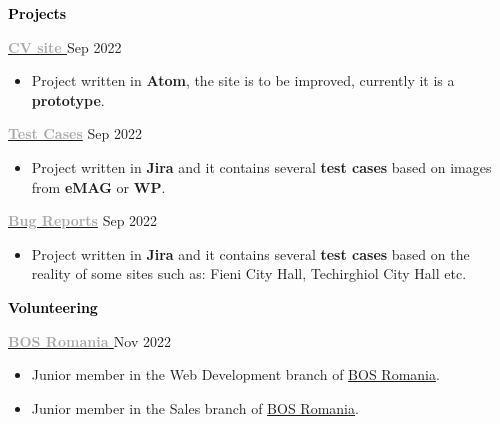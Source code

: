 \documentclass[11pt, a4paper]{article}
\newcommand{\newsection}[2]{\Large\textbf{\textcolor{#2}{#1}} \hrulefill\normalsize} %
\newcommand{\newsubsection}[4]{\normalsize\textbf{\textcolor{#3}{#1}} \hfill\small\textcolor{#4}{#2}\normalsize} %
\newcommand{\customitem}{\vspace{-1.5mm}\item}
\newenvironment{cvsection}[2] %
{
    \newsection{#1}{#2}
    \vspace{1mm}
    \small
    
}
{
    \vspace{1mm}
}
\newenvironment{newentry}[5] %
{
    \newsubsection{#1}{#2}{#3}{#4}
    \small
    
    \textcolor{#4}{#5}
    \begin{itemize}
        \small
}
{
    \end{itemize}
}
\begin{document}
\begin{cvsection}{Projects}{black}
    \begin{newentry}{\href{https://github.com/Andrei4226/CV}{\textcolor{darkgray}{CV site \faExternalLink}}}{Sep 2022}{darkgray}{mediumgray}{\vspace{-3mm}}
        \customitem Project written in \textbf{Atom}, the site is to be improved, currently it is a \textbf{prototype}.
    \end{newentry}
    
    \begin{newentry}{\href{https://github.com/Andrei4226/Test-Cases}{\textcolor{darkgray}{Test Cases\faExternalLink}}}{Sep 2022}{darkgray}{mediumgray}{\vspace{-3mm}}
        \customitem Project written in \textbf{Jira} and it contains several \textbf{test cases} based on images from \textbf{eMAG} or \textbf{WP}.
    \end{newentry}
    
    \begin{newentry}{\href{https://github.com/Andrei4226/Bug-report}{\textcolor{darkgray}{Bug Reports\faExternalLink}}}{Sep 2022 }{darkgray}{mediumgray}{\vspace{-3mm}}
        \customitem Project written in \textbf{Jira} and it contains several \textbf{test cases} based on the reality of some sites such as: Fieni City Hall, Techirghiol City Hall etc.
    \end{newentry}

{\vspace{1mm}}

\begin{cvsection}{Volunteering}{black}
{\vspace{1mm}}
    
    \begin{newentry}{\href{https://bosromania.ro/}{\textcolor{darkgray}{BOS Romania \faExternalLink}}}{Nov 2022}{darkgray}{mediumgray}{\vspace{-3mm}}
        \customitem Junior member in the Web Development branch of \href{https://bosromania.ro/}{BOS Romania}.
        \customitem Junior member in the Sales branch of \href{https://bosromania.ro/}{BOS Romania}.
    \end{newentry}
    
\end{cvsection}


\end{cvsection}
\end{document}
